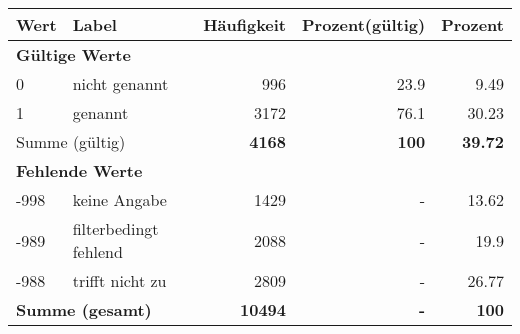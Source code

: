      \begin{longtable}{lXrrr}
     \toprule
     \textbf{Wert} & \textbf{Label} & \textbf{Häufigkeit} & \textbf{Prozent(gültig)} & \textbf{Prozent} \\
     \endhead
     \midrule
     \multicolumn{5}{l}{\textbf{Gültige Werte}}\\

     0 &
     \multicolumn{1}{X}{ nicht genannt   } &


       \num{996} &
       \num[round-mode=places,round-precision=2]{23,9} &
         \num[round-mode=places,round-precision=2]{9,49} \\

     1 &
     \multicolumn{1}{X}{ genannt   } &


       \num{3172} &
       \num[round-mode=places,round-precision=2]{76,1} &
         \num[round-mode=places,round-precision=2]{30,23} \\
     \midrule
     \multicolumn{2}{l}{Summe (gültig)} &
       \textbf{\num{4168}} &
     \textbf{100} &
       \textbf{\num[round-mode=places,round-precision=2]{39,72}} \\
     \multicolumn{5}{l}{\textbf{Fehlende Werte}}\\
       -998 &
       keine Angabe &
         \num{1429} &
        - &
         \num[round-mode=places,round-precision=2]{13,62} \\
       -989 &
       filterbedingt fehlend &
         \num{2088} &
        - &
         \num[round-mode=places,round-precision=2]{19,9} \\
       -988 &
       trifft nicht zu &
         \num{2809} &
        - &
         \num[round-mode=places,round-precision=2]{26,77} \\
     \midrule
     \multicolumn{2}{l}{\textbf{Summe (gesamt)}} &
          \textbf{\num{10494}} &
        \textbf{-} &
        \textbf{100} \\
     \bottomrule
     \end{longtable}
     
